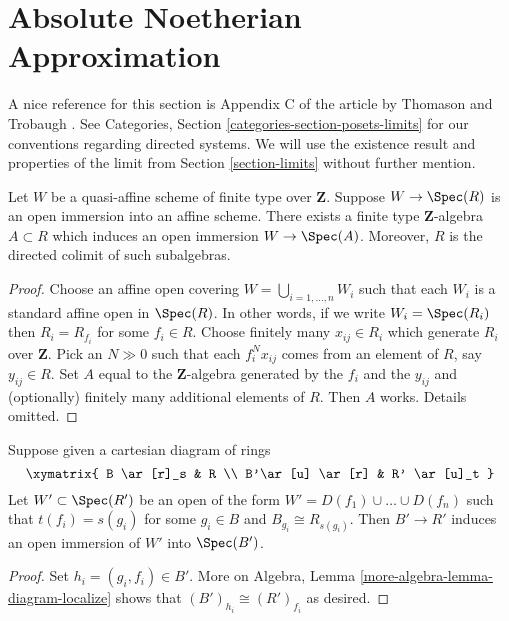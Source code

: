 \section{Absolute Noetherian Approximation}
\label{section-approximation}

\noindent
A nice reference for this section is Appendix C of the article
by Thomason and Trobaugh \cite{TT}.
See Categories, Section \ref{categories-section-posets-limits}
for our conventions regarding directed systems.
We will use the existence result and properties of the limit
from Section \ref{section-limits} without further mention.

\begin{lemma}
\label{lemma-quasi-affine-finite-type-over-Z}
Let $W$ be a quasi-affine scheme of finite type over
$\mathbf{Z}$. Suppose $W \to \Spec(R)$ is an
open immersion into an affine scheme. There exists a
finite type $\mathbf{Z}$-algebra $A \subset R$
which induces an open immersion $W \to \Spec(A)$.
Moreover, $R$ is the directed colimit of such subalgebras.
\end{lemma}

\begin{proof}
Choose an affine open covering $W = \bigcup_{i = 1, \ldots, n} W_i$
such that each $W_i$ is a standard affine open in $\Spec(R)$.
In other words, if we write $W_i = \Spec(R_i)$
then $R_i = R_{f_i}$ for some $f_i \in R$.
Choose finitely many $x_{ij} \in R_i$ which generate
$R_i$ over $\mathbf{Z}$.
Pick an $N \gg 0$ such that each $f_i^Nx_{ij}$ comes from an
element of $R$, say $y_{ij} \in R$.
Set $A$ equal to the $\mathbf{Z}$-algebra generated by
the $f_i$ and the $y_{ij}$ and (optionally) finitely many
additional elements of $R$. Then $A$ works. Details omitted.
\end{proof}

\begin{lemma}
\label{lemma-diagram}
Suppose given a cartesian diagram of rings
$$
\xymatrix{
B \ar[r]_s & R \\
B'\ar[u] \ar[r] & R' \ar[u]_t
}
$$
Let $W' \subset \Spec(R')$ be an open of
the form $W' = D(f_1) \cup \ldots \cup D(f_n)$
such that $t(f_i) = s(g_i)$ for some $g_i \in B$
and $B_{g_i} \cong R_{s(g_i)}$. Then $B' \to R'$
induces an open immersion of $W'$ into $\Spec(B')$.
\end{lemma}

\begin{proof}
Set $h_i = (g_i, f_i) \in B'$. More on Algebra,
Lemma \ref{more-algebra-lemma-diagram-localize} shows that
$(B')_{h_i} \cong (R')_{f_i}$ as desired.
\end{proof}

